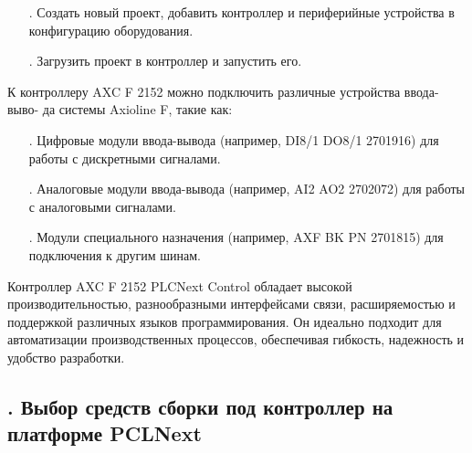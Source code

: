 {\begin{itemize}[leftmargin=2.15cm, labelwidth=0.65cm, labelsep=0.0cm]
		\item[\theitemcntr. ] Создать новый проект, добавить контроллер и периферийные устройства в конфигурацию оборудования.
		\addtocounter{itemcntr}{1}

		\item[\theitemcntr. ] Загрузить проект в контроллер и запустить его.
		\addtocounter{itemcntr}{1}

	\end{itemize} \setcounter{itemcntr}{1}

	\par \redline К контроллеру AXC F 2152 можно подключить различные устройства ввода-выво- да системы Axioline F, такие как:

	\begin{itemize}[leftmargin=2.15cm, labelwidth=0.65cm, labelsep=0.0cm] 

		\item[\theitemcntr. ] Цифровые модули ввода-вывода (например, DI8/1 DO8/1 2701916) для работы с дискретными сигналами. 
		\addtocounter{itemcntr}{1}

		\item[\theitemcntr. ] Аналоговые модули ввода-вывода (например, AI2 AO2 2702072) для работы с аналоговыми сигналами. 
		\addtocounter{itemcntr}{1}

		\item[\theitemcntr. ] Модули специального назначения (например, AXF BK PN 2701815) для подключения к другим шинам.
		\addtocounter{itemcntr}{1}

	\end{itemize} \setcounter{itemcntr}{1}

	\par \redline Контроллер AXC F 2152 PLCNext Control обладает высокой производительностью, разнообразными интерфейсами связи, расширяемостью и поддержкой различных языков программирования. Он идеально подходит для автоматизации производственных процессов, обеспечивая гибкость, надежность и удобство разработки.

	\par
}

\subtitlespace

\subsection*{
	\gostTitleFont
	\redline
	\thechaptercntr .\thesubchaptercntr \spc
	Выбор средств сборки под контроллер на платформе PCLNext
} \addtocounter{subchaptercntr}{1}

